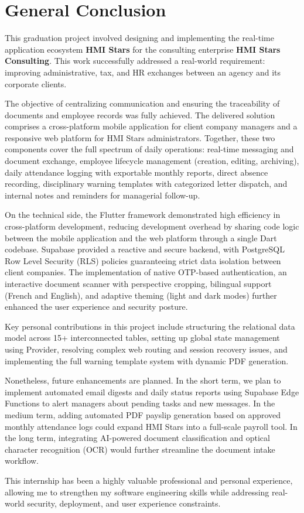 \chapter*{General Conclusion}
This graduation project involved designing and implementing the real-time application ecosystem \textbf{HMI Stars} for the consulting enterprise \textbf{HMI Stars Consulting}. This work successfully addressed a real-world requirement: improving administrative, tax, and HR exchanges between an agency and its corporate clients.

The objective of centralizing communication and ensuring the traceability of documents and employee records was fully achieved. The delivered solution comprises a cross-platform mobile application for client company managers and a responsive web platform for HMI Stars administrators. Together, these two components cover the full spectrum of daily operations: real-time messaging and document exchange, employee lifecycle management (creation, editing, archiving), daily attendance logging with exportable monthly reports, direct absence recording, disciplinary warning templates with categorized letter dispatch, and internal notes and reminders for managerial follow-up.

On the technical side, the Flutter framework demonstrated high efficiency in cross-platform development, reducing development overhead by sharing code logic between the mobile application and the web platform through a single Dart codebase. Supabase provided a reactive and secure backend, with PostgreSQL Row Level Security (RLS) policies guaranteeing strict data isolation between client companies. The implementation of native OTP-based authentication, an interactive document scanner with perspective cropping, bilingual support (French and English), and adaptive theming (light and dark modes) further enhanced the user experience and security posture.

Key personal contributions in this project include structuring the relational data model across 15+ interconnected tables, setting up global state management using Provider, resolving complex web routing and session recovery issues, and implementing the full warning template system with dynamic PDF generation.

Nonetheless, future enhancements are planned. In the short term, we plan to implement automated email digests and daily status reports using Supabase Edge Functions to alert managers about pending tasks and new messages. In the medium term, adding automated PDF payslip generation based on approved monthly attendance logs could expand HMI Stars into a full-scale payroll tool. In the long term, integrating AI-powered document classification and optical character recognition (OCR) would further streamline the document intake workflow.

This internship has been a highly valuable professional and personal experience, allowing me to strengthen my software engineering skills while addressing real-world security, deployment, and user experience constraints.
